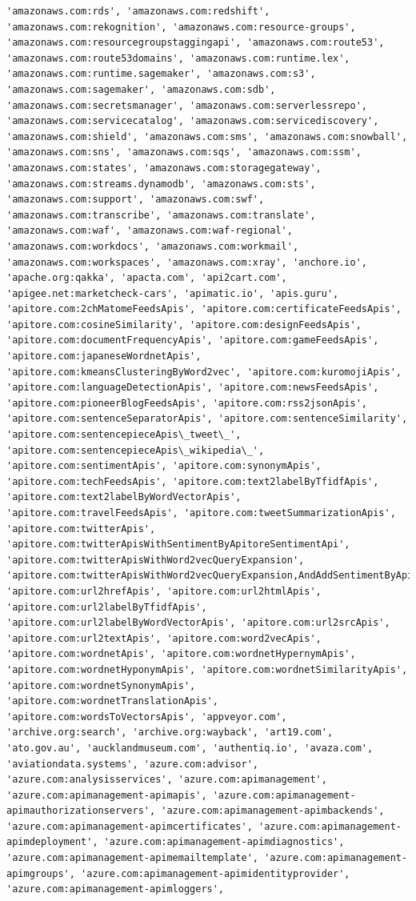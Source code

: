 \documentclass[11pt]{article}
\begin{document}
\begin{Verbatim}[commandchars=\\\{\}]
'amazonaws.com:rds', 'amazonaws.com:redshift', 'amazonaws.com:rekognition', 'amazonaws.com:resource-groups', 'amazonaws.com:resourcegroupstaggingapi', 'amazonaws.com:route53', 'amazonaws.com:route53domains', 'amazonaws.com:runtime.lex', 'amazonaws.com:runtime.sagemaker', 'amazonaws.com:s3', 'amazonaws.com:sagemaker', 'amazonaws.com:sdb', 'amazonaws.com:secretsmanager', 'amazonaws.com:serverlessrepo', 'amazonaws.com:servicecatalog', 'amazonaws.com:servicediscovery', 'amazonaws.com:shield', 'amazonaws.com:sms', 'amazonaws.com:snowball', 'amazonaws.com:sns', 'amazonaws.com:sqs', 'amazonaws.com:ssm', 'amazonaws.com:states', 'amazonaws.com:storagegateway', 'amazonaws.com:streams.dynamodb', 'amazonaws.com:sts', 'amazonaws.com:support', 'amazonaws.com:swf', 'amazonaws.com:transcribe', 'amazonaws.com:translate', 'amazonaws.com:waf', 'amazonaws.com:waf-regional', 'amazonaws.com:workdocs', 'amazonaws.com:workmail', 'amazonaws.com:workspaces', 'amazonaws.com:xray', 'anchore.io', 'apache.org:qakka', 'apacta.com', 'api2cart.com', 'apigee.net:marketcheck-cars', 'apimatic.io', 'apis.guru', 'apitore.com:2chMatomeFeedsApis', 'apitore.com:certificateFeedsApis', 'apitore.com:cosineSimilarity', 'apitore.com:designFeedsApis', 'apitore.com:documentFrequencyApis', 'apitore.com:gameFeedsApis', 'apitore.com:japaneseWordnetApis', 'apitore.com:kmeansClusteringByWord2vec', 'apitore.com:kuromojiApis', 'apitore.com:languageDetectionApis', 'apitore.com:newsFeedsApis', 'apitore.com:pioneerBlogFeedsApis', 'apitore.com:rss2jsonApis', 'apitore.com:sentenceSeparatorApis', 'apitore.com:sentenceSimilarity', 'apitore.com:sentencepieceApis\_tweet\_', 'apitore.com:sentencepieceApis\_wikipedia\_', 'apitore.com:sentimentApis', 'apitore.com:synonymApis', 'apitore.com:techFeedsApis', 'apitore.com:text2labelByTfidfApis', 'apitore.com:text2labelByWordVectorApis', 'apitore.com:travelFeedsApis', 'apitore.com:tweetSummarizationApis', 'apitore.com:twitterApis', 'apitore.com:twitterApisWithSentimentByApitoreSentimentApi', 'apitore.com:twitterApisWithWord2vecQueryExpansion', 'apitore.com:twitterApisWithWord2vecQueryExpansion,AndAddSentimentByApitoreSentimentApi', 'apitore.com:url2hrefApis', 'apitore.com:url2htmlApis', 'apitore.com:url2labelByTfidfApis', 'apitore.com:url2labelByWordVectorApis', 'apitore.com:url2srcApis', 'apitore.com:url2textApis', 'apitore.com:word2vecApis', 'apitore.com:wordnetApis', 'apitore.com:wordnetHypernymApis', 'apitore.com:wordnetHyponymApis', 'apitore.com:wordnetSimilarityApis', 'apitore.com:wordnetSynonymApis', 'apitore.com:wordnetTranslationApis', 'apitore.com:wordsToVectorsApis', 'appveyor.com', 'archive.org:search', 'archive.org:wayback', 'art19.com', 'ato.gov.au', 'aucklandmuseum.com', 'authentiq.io', 'avaza.com', 'aviationdata.systems', 'azure.com:advisor', 'azure.com:analysisservices', 'azure.com:apimanagement', 'azure.com:apimanagement-apimapis', 'azure.com:apimanagement-apimauthorizationservers', 'azure.com:apimanagement-apimbackends', 'azure.com:apimanagement-apimcertificates', 'azure.com:apimanagement-apimdeployment', 'azure.com:apimanagement-apimdiagnostics', 'azure.com:apimanagement-apimemailtemplate', 'azure.com:apimanagement-apimgroups', 'azure.com:apimanagement-apimidentityprovider', 'azure.com:apimanagement-apimloggers', 
\end{Verbatim}
\end{document}
